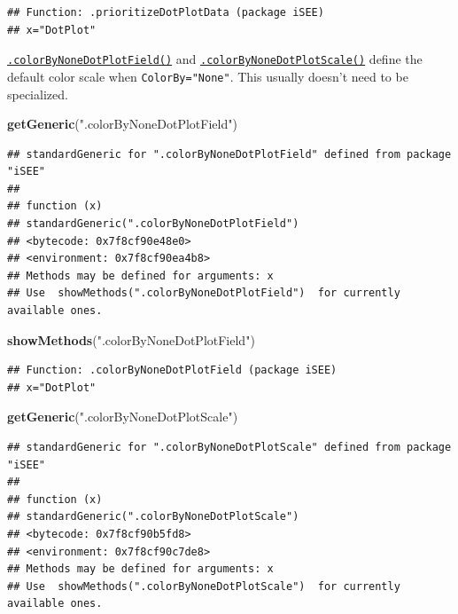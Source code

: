 \documentclass[
]{book}
\newenvironment{Shaded}{\begin{snugshade}}{\end{snugshade}}
\newcommand{\KeywordTok}[1]{\textcolor[rgb]{0.13,0.29,0.53}{\textbf{#1}}}
\newcommand{\NormalTok}[1]{#1}
\newcommand{\StringTok}[1]{\textcolor[rgb]{0.31,0.60,0.02}{#1}}
\begin{document}
\begin{verbatim}
## Function: .prioritizeDotPlotData (package iSEE)
## x="DotPlot"
\end{verbatim}

\href{https://isee.github.io/iSEE/reference/plot-generics.html}{\texttt{.colorByNoneDotPlotField()}} and \href{https://isee.github.io/iSEE/reference/plot-generics.html}{\texttt{.colorByNoneDotPlotScale()}} define the default color scale when \texttt{ColorBy="None"}.
This usually doesn't need to be specialized.

\begin{Shaded}
\begin{Highlighting}[]
\KeywordTok{getGeneric}\NormalTok{(}\StringTok{".colorByNoneDotPlotField"}\NormalTok{)}
\end{Highlighting}
\end{Shaded}

\begin{verbatim}
## standardGeneric for ".colorByNoneDotPlotField" defined from package "iSEE"
## 
## function (x) 
## standardGeneric(".colorByNoneDotPlotField")
## <bytecode: 0x7f8cf90e48e0>
## <environment: 0x7f8cf90ea4b8>
## Methods may be defined for arguments: x
## Use  showMethods(".colorByNoneDotPlotField")  for currently available ones.
\end{verbatim}

\begin{Shaded}
\begin{Highlighting}[]
\KeywordTok{showMethods}\NormalTok{(}\StringTok{".colorByNoneDotPlotField"}\NormalTok{)}
\end{Highlighting}
\end{Shaded}

\begin{verbatim}
## Function: .colorByNoneDotPlotField (package iSEE)
## x="DotPlot"
\end{verbatim}

\begin{Shaded}
\begin{Highlighting}[]
\KeywordTok{getGeneric}\NormalTok{(}\StringTok{".colorByNoneDotPlotScale"}\NormalTok{)}
\end{Highlighting}
\end{Shaded}

\begin{verbatim}
## standardGeneric for ".colorByNoneDotPlotScale" defined from package "iSEE"
## 
## function (x) 
## standardGeneric(".colorByNoneDotPlotScale")
## <bytecode: 0x7f8cf90b5fd8>
## <environment: 0x7f8cf90c7de8>
## Methods may be defined for arguments: x
## Use  showMethods(".colorByNoneDotPlotScale")  for currently available ones.
\end{verbatim}
\end{document}
